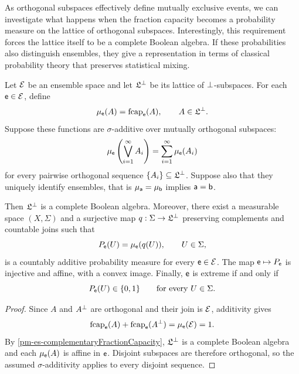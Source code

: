 As orthogonal subspaces effectively define mutually exclusive events, we can investigate what happens when the fraction capacity becomes a probability measure on the lattice of orthogonal subspaces. Interestingly, this requirement forces the lattice itself to be a complete Boolean algebra. If these probabilities also distinguish ensembles, they give a representation in terms of classical probability theory that preserves statistical mixing. 

\begin{mathSection}
\begin{prop}\label{pm-es-probabilityRepresentation}
	Let $\Ens$ be an ensemble space and let $\mathfrak{L}^{\ortho}$ be its lattice of $\ortho$-subspaces. For each $\ens \in \Ens$, define
	\begin{equation}
		\mu_{\ens}(A) = \fcap_{\ens}(A),
		\qquad A \in \mathfrak{L}^{\ortho}.
	\end{equation}
	Suppose these functions are $\sigma$-additive over mutually orthogonal subspaces:
	\begin{equation}
		\mu_{\ens}\left(\bigvee_{i=1}^{\infty} A_i\right)
		= \sum_{i=1}^{\infty}\mu_{\ens}(A_i)
	\end{equation}
	for every pairwise orthogonal sequence $\{A_i\} \subseteq \mathfrak{L}^{\ortho}$. Suppose also that they uniquely identify ensembles, that is $\mu_{\ens[a]}=\mu_{\ens[b]}$ implies $\ens[a]=\ens[b]$.
	
	Then $\mathfrak{L}^{\ortho}$ is a complete Boolean algebra. Moreover, there exist a measurable space $(X,\Sigma)$ and a surjective map $q:\Sigma \to \mathfrak{L}^{\ortho}$ preserving complements and countable joins such that
	\begin{equation}
		P_{\ens}(U) = \mu_{\ens}(q(U)),
		\qquad U \in \Sigma,
	\end{equation}
	is a countably additive probability measure for every $\ens \in \Ens$. The map $\ens \mapsto P_{\ens}$ is injective and affine, with a convex image. Finally, $\ens$ is extreme if and only if
	\begin{equation}
		P_{\ens}(U) \in \{0,1\}
		\qquad \text{for every } U \in \Sigma.
	\end{equation}
\end{prop}

\begin{proof}
	Since $A$ and $A^{\ortho}$ are orthogonal and their join is $\Ens$, additivity gives
	\begin{equation}
		\fcap_{\ens}(A)+\fcap_{\ens}(A^{\ortho})
		= \mu_{\ens}(\Ens) = 1.
	\end{equation}
	By \ref{pm-es-complementaryFractionCapacity}, $\mathfrak{L}^{\ortho}$ is a complete Boolean algebra and each $\mu_{\ens}(A)$ is affine in $\ens$. Disjoint subspaces are therefore orthogonal, so the assumed $\sigma$-additivity applies to every disjoint sequence.
	

\end{proof}
\end{mathSection}
